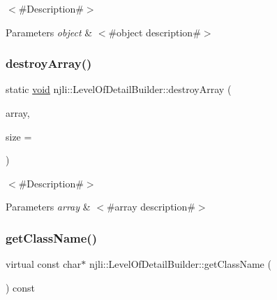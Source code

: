 $<$\#\+Description\#$>$


\begin{DoxyParams}{Parameters}
{\em object} & $<$\#object description\#$>$ \\
\hline
\end{DoxyParams}
\mbox{\label{classnjli_1_1_level_of_detail_builder_a06ea6b988384235d876bb57e1b2417ac}} 
\subsubsection{\texorpdfstring{destroy\+Array()}{destroyArray()}}
{\footnotesize\ttfamily static \mbox{\hyperlink{_thread_8h_af1e856da2e658414cb2456cb6f7ebc66}{void}} njli\+::\+Level\+Of\+Detail\+Builder\+::destroy\+Array (\begin{DoxyParamCaption}\item[{\mbox{\hyperlink{classnjli_1_1_level_of_detail_builder}{Level\+Of\+Detail\+Builder}} $\ast$$\ast$}]{array,  }\item[{const \mbox{\hyperlink{_util_8h_a10e94b422ef0c20dcdec20d31a1f5049}{u32}}}]{size = {} }\end{DoxyParamCaption})\hspace{0.3cm}{\ttfamily [static]}}

$<$\#\+Description\#$>$


\begin{DoxyParams}{Parameters}
{\em array} & $<$\#array description\#$>$ \\
\hline
\end{DoxyParams}
\mbox{\label{classnjli_1_1_level_of_detail_builder_aacfd436ae9d8b6aa1a96e4051157ba1c}} 
\subsubsection{\texorpdfstring{get\+Class\+Name()}{getClassName()}}
{\footnotesize\ttfamily virtual const char$\ast$ njli\+::\+Level\+Of\+Detail\+Builder\+::get\+Class\+Name (\begin{DoxyParamCaption}{ }\end{DoxyParamCaption}) const\hspace{0.3cm}{\ttfamily [virtual]}}

